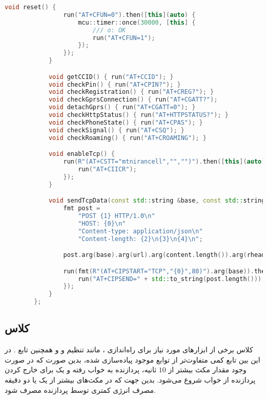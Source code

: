 \begin{latin}
\begin{lstlisting}[language=c++, caption={}]
			void reset() {
				run("AT+CFUN=0").then([this](auto) {
					mcu::timer::once(30000, [this] {
						/// o: OK
						run("AT+CFUN=1");
					});
				});
			}

			void getCCID() { run("AT+CCID"); }
			void checkPin() { run("AT+CPIN?"); }
			void checkRegistration() { run("AT+CREG?"); }
			void checkGprsConnection() { run("AT+CGATT?");
			void detachGprs() { run("AT+CGATT=0"); }
			void checkHttpStatus() { run("AT+HTTPSTATUS?"); }
			void checkPhoneState() { run("AT+CPAS"); }
			void checkSignal() { run("AT+CSQ"); }
			void checkRoaming() { run("AT+CROAMING"); }

			void enableTcp() {
				run(R"(AT+CSTT="mtnirancell","","")").then([this](auto) {
					run("AT+CIICR");
				});
			}

		    void sendTcpData(const std::string &base, const std::string &url, const std::string &content, const std::string &rheader) {
				fmt post =
					"POST {1} HTTP/1.0\n"
					"HOST: {0}\n"
					"Content-type: application/json\n"
					"Content-length: {2}\n{3}\n{4}\n";

				post.arg(base).arg(url).arg(content.length()).arg(rheader).arg(content);

				run(fmt(R"(AT+CIPSTART="TCP","{0}",80)").arg(base)).then([this, &post](auto) {
					run("AT+CIPSEND=" + std::to_string(post.length()));
				});
			}
		};
	\end{lstlisting}
\end{latin}

\subsection{کلاس }
کلاس
برخی از ابزارهای مورد نیاز برای راه‌اندازی ، مانند تنظیم  و  و همچنین تابع .
در این بین تابع  کمی متفاوت‌تر از توابع موجود پیاده‌سازی شده، بدین صورت که در صورت وجود مقدار مکث بیشتر از
$10$
ثانیه، پردازنده به خواب رفته و یک  برای خارج کردن پردازنده از خواب شروع می‌شود.
بدین جهت که در مکث‌های بیشتر از یک یا دو دقیقه مصرف انرژی کمتری توسط پردازنده مصرف شود.

